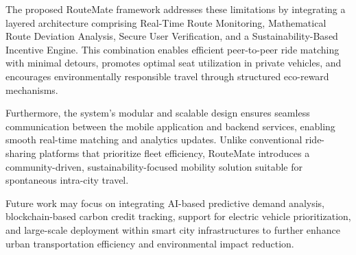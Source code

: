 \documentclass[conference]{IEEEtran}
\begin{document}
The proposed RouteMate framework addresses these limitations by integrating a layered architecture comprising Real-Time Route Monitoring, Mathematical Route Deviation Analysis, Secure User Verification, and a Sustainability-Based Incentive Engine. This combination enables efficient peer-to-peer ride matching with minimal detours, promotes optimal seat utilization in private vehicles, and encourages environmentally responsible travel through structured eco-reward mechanisms.

Furthermore, the system’s modular and scalable design ensures seamless communication between the mobile application and backend services, enabling smooth real-time matching and analytics updates. Unlike conventional ride-sharing platforms that prioritize fleet efficiency, RouteMate introduces a community-driven, sustainability-focused mobility solution suitable for spontaneous intra-city travel.

Future work may focus on integrating AI-based predictive demand analysis, blockchain-based carbon credit tracking, support for electric vehicle prioritization, and large-scale deployment within smart city infrastructures to further enhance urban transportation efficiency and environmental impact reduction.
\end{document}
